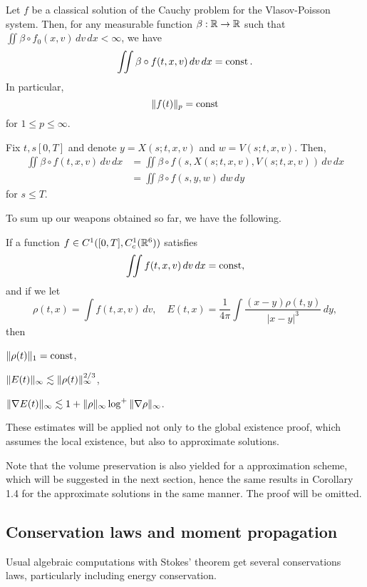 \documentclass[11pt]{amsart}
\begin{document}
\begin{cor}
Let $f$ be a classical solution of the Cauchy problem for the Vlasov-Poisson system.
Then, for any measurable function $\beta:\mathbb{R}\to\mathbb{R}$ such that $\iint\beta\circ f_0(x,v)\,dv\,dx<\infty$, we have
\[\iint\beta\circ f(t,x,v)\,dv\,dx=\operatorname{const}.\]
In particular,
\[\|f(t)\|_p=\operatorname{const}\]
for $1\le p\le\infty$.
\end{cor}
\begin{pf}
Fix $t,s[0,T]$ and denote $y=X(s;t,x,v)$ and $w=V(s;t,x,v)$.
Then,
\begin{align*}
\iint\beta\circ f(t,x,v)\,dv\,dx
&=\iint\beta\circ f(s,X(s;t,x,v),V(s;t,x,v))\,dv\,dx\\
&=\iint\beta\circ f(s,y,w)\,dw\,dy
\end{align*}
for $s\le T$.
\end{pf}

To sum up our weapons obtained so far, we have the following.
\begin{cor}
If a function $f\in C^1([0,T],C_c^1(\mathbb{R}^6))$ satisfies
\[\iint f(t,x,v)\,dv\,dx=\operatorname{const},\]
and if we let
\[\rho(t,x)=\int f(t,x,v)\,dv,\quad E(t,x)=\frac1{4\pi}\int\frac{(x-y)\rho(t,y)}{|x-y|^3}\,dy,\]
then
\begin{cond}
\item $\|\rho(t)\|_1=\operatorname{const}$,
\item $\|E(t)\|_\infty\lesssim\|\rho(t)\|_\infty^{2/3}$,
\item $\|\nabla E(t)\|_\infty\lesssim1+\|\rho\|_\infty\log^+\|\nabla\rho\|_\infty$.
\end{cond}
\end{cor}
These estimates will be applied not only to the global existence proof, which assumes the local existence, but also to approximate solutions.

\begin{rmk}
Note that the volume preservation is also yielded for a approximation scheme, which will be suggested in the next section, hence the same results in Corollary 1.4 for the approximate solutions in the same manner.
The proof will be omitted.
\end{rmk}


\subsection{Conservation laws and moment propagation}
Usual algebraic computations with Stokes' theorem get several conservations laws, particularly including energy conservation.
\end{document}
